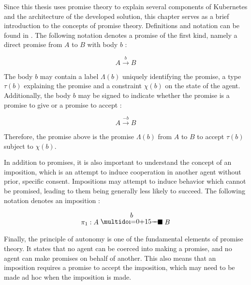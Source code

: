Since this thesis uses promise theory to explain several components of Kubernetes and the architecture of the developed solution, this chapter serves as a brief introduction to the concepts of promise theory.
Definitions and notation can be found in \cite{promise-theory}.
The following notation denotes a promise of the first kind, namely a direct promise from $A$ to $B$ with body $b$ \parencite{promise-theory}:

\[ A \xrightarrow{b} B \]

The body $b$ may contain a label $\Lambda (b)$ uniquely identifying the promise, a type $\tau (b)$ explaining the promise and a constraint $\chi (b)$ on the state of the agent.
Additionally, the body $b$ may be signed to indicate whether the promise is a promise to give or a promise to accept \parencite{promise-theory}:

\[ A \xrightarrow{-b} B \]

Therefore, the promise above is the promise $\Lambda (b)$ from $A$ to $B$ to accept $\tau (b)$ subject to $\chi (b)$.
\clearpage

In addition to promises, it is also important to understand the concept of an imposition, which is an attempt to induce cooperation in another agent without prior, specific consent.
Impositions may attempt to induce behavior which cannot be promised, leading to them being generally less likely to succeed. \parencite{promise-theory}
The following notation denotes an imposition \parencite{promise-theory}:

\[ \pi _1: A \impose{b}{5} B \]

Finally, the principle of autonomy is one of the fundamental elements of promise theory.
It states that no agent can be coerced into making a promise, and no agent can make promises on behalf of another.
This also means that an imposition requires a promise to accept the imposition, which may need to be made ad hoc when the imposition is made. \parencite{promise-theory}
